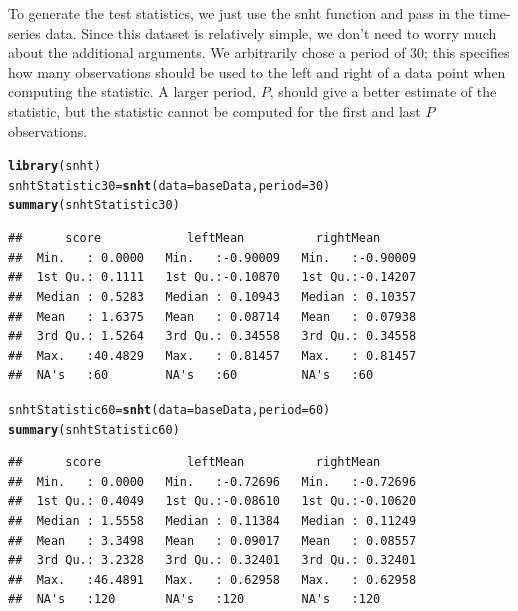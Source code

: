 \documentclass[nojss]{jss}\usepackage[]{graphicx}\usepackage[]{color}
\makeatletter
\newcommand{\hlnum}[1]{\textcolor[rgb]{0.686,0.059,0.569}{#1}}%
\newcommand{\hlstd}[1]{\textcolor[rgb]{0.345,0.345,0.345}{#1}}%
\newcommand{\hlkwb}[1]{\textcolor[rgb]{0.69,0.353,0.396}{#1}}%
\newcommand{\hlkwc}[1]{\textcolor[rgb]{0.333,0.667,0.333}{#1}}%
\newcommand{\hlkwd}[1]{\textcolor[rgb]{0.737,0.353,0.396}{\textbf{#1}}}%
\newenvironment{kframe}{%
 \def\at@end@of@kframe{}%
 \ifinner\ifhmode%
  \def\at@end@of@kframe{\end{minipage}}%
  \begin{minipage}{\columnwidth}%
 \fi\fi%
 \def\FrameCommand##1{\hskip\@totalleftmargin \hskip-\fboxsep
 \colorbox{shadecolor}{##1}\hskip-\fboxsep
     \hskip-\linewidth \hskip-\@totalleftmargin \hskip\columnwidth}%
 \MakeFramed {\advance\hsize-\width
   \@totalleftmargin\z@ \linewidth\hsize
   \@setminipage}}%
 {\par\unskip\endMakeFramed%
 \at@end@of@kframe}
\newenvironment{knitrout}{}{} %
\makeatother
\begin{document}
To generate the test statistics, we just use the snht function and pass in the time-series data.  Since this dataset is relatively simple, we don't need to worry much about the additional arguments.  We arbitrarily chose a period of 30; this specifies how many observations should be used to the left and right of a data point when computing the statistic.  A larger period, $P$, should give a better estimate of the statistic, but the statistic cannot be computed for the first and last $P$ observations.

\begin{knitrout}
\color{fgcolor}\begin{kframe}
\begin{alltt}
\hlkwd{library}\hlstd{(snht)}
\hlstd{snhtStatistic30} \hlkwb{=} \hlkwd{snht}\hlstd{(}\hlkwc{data} \hlstd{= baseData,} \hlkwc{period} \hlstd{=} \hlnum{30}\hlstd{)}
\hlkwd{summary}\hlstd{(snhtStatistic30)}
\end{alltt}
\begin{verbatim}
##      score            leftMean          rightMean       
##  Min.   : 0.0000   Min.   :-0.90009   Min.   :-0.90009  
##  1st Qu.: 0.1111   1st Qu.:-0.10870   1st Qu.:-0.14207  
##  Median : 0.5283   Median : 0.10943   Median : 0.10357  
##  Mean   : 1.6375   Mean   : 0.08714   Mean   : 0.07938  
##  3rd Qu.: 1.5264   3rd Qu.: 0.34558   3rd Qu.: 0.34558  
##  Max.   :40.4829   Max.   : 0.81457   Max.   : 0.81457  
##  NA's   :60        NA's   :60         NA's   :60
\end{verbatim}
\begin{alltt}
\hlstd{snhtStatistic60} \hlkwb{=} \hlkwd{snht}\hlstd{(}\hlkwc{data} \hlstd{= baseData,} \hlkwc{period} \hlstd{=} \hlnum{60}\hlstd{)}
\hlkwd{summary}\hlstd{(snhtStatistic60)}
\end{alltt}
\begin{verbatim}
##      score            leftMean          rightMean       
##  Min.   : 0.0000   Min.   :-0.72696   Min.   :-0.72696  
##  1st Qu.: 0.4049   1st Qu.:-0.08610   1st Qu.:-0.10620  
##  Median : 1.5558   Median : 0.11384   Median : 0.11249  
##  Mean   : 3.3498   Mean   : 0.09017   Mean   : 0.08557  
##  3rd Qu.: 3.2328   3rd Qu.: 0.32401   3rd Qu.: 0.32401  
##  Max.   :46.4891   Max.   : 0.62958   Max.   : 0.62958  
##  NA's   :120       NA's   :120        NA's   :120
\end{verbatim}
\end{kframe}
\end{knitrout}
\end{document}

